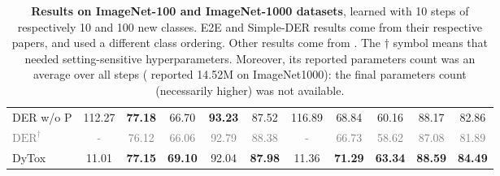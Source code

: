 \begin{table*}[t]
\begin{tabular}{l|ccccc|ccccc}
        DER w/o P \cite{yan2021der}                              & 112.27                                    & \textbf{77.18}                            & 66.70                               & \textbf{93.23}                  & 87.52                              & 116.89                             & 68.84                   & 60.16                   & 88.17                   & 82.86                   \\ %
        \textcolor{gray}{$\text{DER}^\dagger$} \cite{yan2021der} & \textcolor{gray}{-}                       & \textcolor{gray}{76.12}                   & \textcolor{gray}{66.06}             & \textcolor{gray}{92.79}         & \textcolor{gray}{88.38}            & \textcolor{gray}{-}                & \textcolor{gray}{66.73} & \textcolor{gray}{58.62} & \textcolor{gray}{87.08} & \textcolor{gray}{81.89} \\
        \hline
        DyTox                                                    & 11.01                                     & \textbf{77.15}                            & \textbf{69.10}                      & 92.04                           & \textbf{87.98}                     & 11.36                              & \textbf{71.29}          & \textbf{63.34}          & \textbf{88.59}          & \textbf{84.49}          \\
        \hline
    \end{tabular}
    \caption{\textbf{Results on ImageNet-100  and ImageNet-1000 datasets}, learned with 10 steps of
        respectively 10 and 100 new classes. E2E \cite{castro2018end_to_end_inc_learn} and Simple-DER
        \cite{li2021preserve} results come from their respective papers, and used a different class
        ordering. Other results come from \cite{yan2021der}. The $\dagger$ symbol means that
        \cite{yan2021der} needed setting-sensitive hyperparameters. Moreover, its reported parameters
        count was an average over all steps (\cite{yan2021der} reported 14.52M on ImageNet1000): the
        final parameters count (necessarily higher) was not available.}
    \label{tab:dytox_imagenet}
\end{table*}
